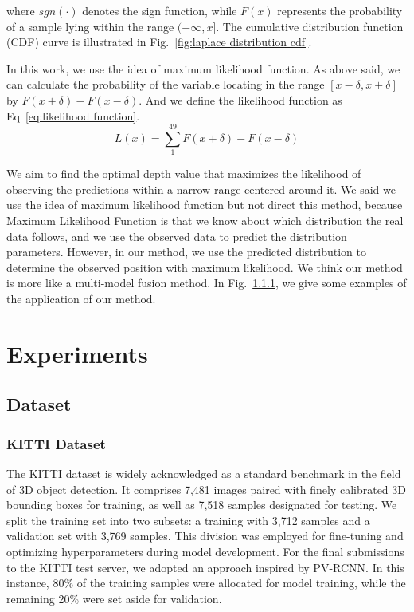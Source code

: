 \documentclass[journal]{IEEEtran}
\begin{document}
		where $sgn(\cdot)$ denotes the sign function, while $F(x)$ represents the probability of a sample lying within the range $(-\infty, x]$. The cumulative distribution function (CDF) curve is illustrated in Fig.~\ref{fig:laplace distribution cdf}.
		
		In this work, we use the idea of maximum likelihood function. As above said, we can calculate the probability of the variable locating in the range $[x-\delta, x+\delta]$ by $F(x+\delta)-F(x-\delta)$. And we define the likelihood function as Eq~\eqref{eq:likelihood function}. 
		\begin{equation}
			L(x) = \sum_{1}^{49} F(x+\delta)-F(x-\delta)
			\label{eq:likelihood function}
		\end{equation}
	
		
		
		We aim to find the optimal depth value that maximizes the likelihood of observing the predictions within a narrow range centered around it. We said we use the idea of maximum likelihood function but not direct this method, because Maximum Likelihood Function is that we know about which distribution the real data follows, and we use the observed data to predict the distribution parameters. However, in our method, we use the predicted distribution to determine the observed position with maximum likelihood. We think our method is more like a multi-model fusion method. In Fig.~\ref{}, we give some examples of the application of our method.
		
		
	
	
	
	\section{Experiments}\label{sec:exp}
	\subsection{Dataset}
	\subsubsection{KITTI Dataset}
	The KITTI dataset is widely acknowledged as a standard benchmark in the field of 3D object detection. It comprises 7,481 images paired with finely calibrated 3D bounding boxes for training, as well as 7,518 samples designated for testing. We split the training set into two subsets: a training with 3,712 samples and a validation set with 3,769 samples. This division was employed for fine-tuning and optimizing hyperparameters during model development. For the final submissions to the KITTI test server, we adopted an approach inspired by PV-RCNN. In this instance, 80\% of the training samples were allocated for model training, while the remaining 20\% were set aside for validation.
	
\end{document}
